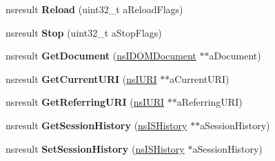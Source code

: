\begin{DoxyCompactItemize}
\item 
\mbox{\label{interfacens_i_web_navigation_af3e1dd2659702d020034298f38f08ada}} 
nsresult {\bfseries Reload} (uint32\+\_\+t a\+Reload\+Flags)
\item 
\mbox{\label{interfacens_i_web_navigation_a6536c403e033b41b3c5b519d63eece54}} 
nsresult {\bfseries Stop} (uint32\+\_\+t a\+Stop\+Flags)
\item 
\mbox{\label{interfacens_i_web_navigation_a5dc134158813d16375cc2a8f3871a5d5}} 
nsresult {\bfseries Get\+Document} (\hyperlink{interfacens_i_d_o_m_document}{ns\+I\+D\+O\+M\+Document} $\ast$$\ast$a\+Document)
\item 
\mbox{\label{interfacens_i_web_navigation_a44c404bdd3b6837d19904b012af0199b}} 
nsresult {\bfseries Get\+Current\+U\+RI} (\hyperlink{interfacens_i_u_r_i}{ns\+I\+U\+RI} $\ast$$\ast$a\+Current\+U\+RI)
\item 
\mbox{\label{interfacens_i_web_navigation_a0d4b7f013f94d05aa2f2657a7867f3f8}} 
nsresult {\bfseries Get\+Referring\+U\+RI} (\hyperlink{interfacens_i_u_r_i}{ns\+I\+U\+RI} $\ast$$\ast$a\+Referring\+U\+RI)
\item 
\mbox{\label{interfacens_i_web_navigation_a851715d4e521cc6d14b1c7853ade1ad1}} 
nsresult {\bfseries Get\+Session\+History} (\hyperlink{interfacens_i_supports}{ns\+I\+S\+History} $\ast$$\ast$a\+Session\+History)
\item 
\mbox{\label{interfacens_i_web_navigation_a649eff97af00ad1c78928762bbbdd3cd}} 
nsresult {\bfseries Set\+Session\+History} (\hyperlink{interfacens_i_supports}{ns\+I\+S\+History} $\ast$a\+Session\+History)
\end{DoxyCompactItemize}
